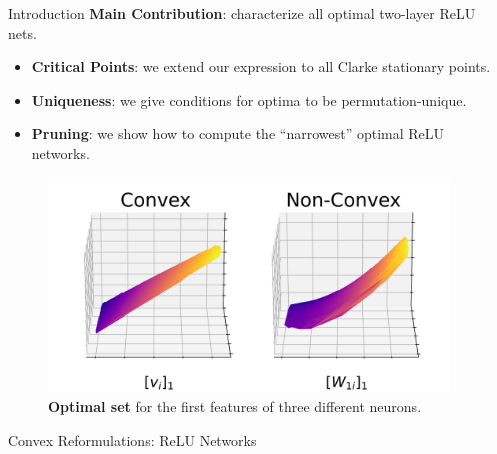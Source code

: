 \documentclass[12pt, usenames, dvipsnames]{beamer}
\newlength{\sepwidth}
\newlength{\colwidth}
\newcommand{\separatorcolumn}{\begin{column}{\sepwidth}\end{column}}
\newcommand{\blue}[1]{\textcolor{CBBlue}{#1}}
\begin{document}
\begin{frame}[t]
	\begin{columns}[t]
		\separatorcolumn

		\begin{column}{\colwidth}
			\vspace{-1.5em}
			\begin{block}{Introduction}
				\large
				{
					\Large
					\blue{\textbf{Main Contribution}}: characterize all optimal two-layer ReLU nets.
				}

				\begin{itemize}
					\item \textbf{Critical Points}: we extend our expression to all Clarke stationary points.

					\item \textbf{Uniqueness}: we give conditions for optima to be permutation-unique.

					\item \textbf{Pruning}: we show how to compute the ``narrowest'' optimal ReLU networks.
				\end{itemize}

				\vspace{-1em}

				\begin{figure}[]
					\centering
					\includegraphics[width=.9\textwidth]{assets/solution_sets_vis_270.png}
					\caption{\textbf{Optimal set} for the first features of three different
						neurons.}
					\vspace{-1em}
					\label{fig:solution-sets}
				\end{figure}

			\end{block}

			\begin{block}{Convex Reformulations: ReLU Networks}

				\begin{columns}[t]
					\begin{column}{0.62\textwidth}


\end{column}
\end{columns}
\end{block}
\end{column}
\end{columns}
\end{frame}
\end{document}
